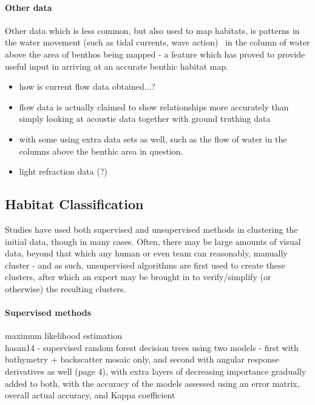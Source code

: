 \documentclass[12pt]{article}
\begin{document}
\begin{multicols}{2}
            \paragraph{Other data}
            Other data which is less common, but also used to map habitats, is patterns in the water movement (such as tidal currents, wave action)~\citep{cjbrown11} in the column of water above the area of benthos being mapped - a feature which has proved to provide useful input in arriving at an accurate benthic habitat map.~\citep{snelgrove94}

            \begin{itemize}
                \item how is current flow data obtained...? 
                \item flow data is actually claimed to show relationships more accurately than simply looking at acoustic data together with ground truthing data ~\citep{kostylev12}
                \item with some using extra data sets as well, such as the flow of water in the columns above the benthic area in question.~\citep{cjbrown11}
                \item light refraction data (?)
            \end{itemize}

            \subsection{Habitat Classification}

            Studies have used both supervised and unsupervised methods in clustering the initial data, though in many cases. Often, there may be large amounts of visual data, beyond that which any human or even team can reasonably, manually cluster - and as such, unsupervised algorithms are first used to create these clusters, after which an expert may be brought in to verify/simplify (or otherwise) the resulting clusters.~\citep{steinberg11} 

            \paragraph{Supervised methods}
            maximum likelihood estimation ~\citep{Micallef12} \\
            hasan14 - supervised random forest decision trees using two models - first with bathymetry + backscatter mosaic only, and second with angular response derivatives as well (page 4), with extra layers of decreasing importance gradually added to both, with the accuracy of the models assessed using an error matrix, overall actual accuracy, and Kappa coefficient ~\citep{hasan14}


\end{multicols}
\end{document}
